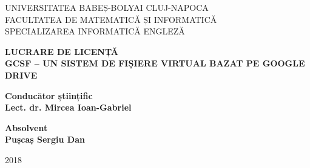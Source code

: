 \begin{titlepage}
\sloppy
\begin{center}
\normalsize{UNIVERSITATEA BABEȘ-BOLYAI CLUJ-NAPOCA}\\
\normalsize{FACULTATEA DE MATEMATICĂ ȘI INFORMATICĂ}\\
\normalsize{SPECIALIZAREA INFORMATICĂ ENGLEZĂ}\\
\end{center}

\vspace{2cm}
\begin{center}
\huge \textbf{LUCRARE DE LICENȚĂ}\\
\vspace{1cm}
\Huge \textbf{GCSF -- UN SISTEM DE FIȘIERE VIRTUAL BAZAT PE GOOGLE DRIVE}
\end{center}

\vspace{2cm}

\begin{flushleft}
  \large \textbf{Conducător științific} \\
\large \textbf{Lect. dr. Mircea Ioan-Gabriel}
\end{flushleft}

\vspace{1cm}

\begin{flushright}
\large \textbf{Absolvent} \\
\large \textbf{Pușcaș Sergiu Dan}
\end{flushright}

\vspace{3cm}
\begin{center}
\Large{2018}
\end{center}

\end{titlepage}
